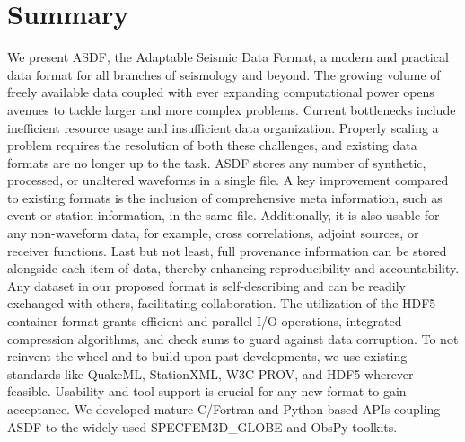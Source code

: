 \section{Summary}

We present ASDF, the Adaptable Seismic Data Format, a modern and practical data
format for all branches of seismology and beyond.
The growing volume of freely available data coupled with ever expanding
computational power opens avenues to tackle larger and more complex problems.
Current bottlenecks include inefficient resource usage and insufficient data
organization. Properly scaling a problem requires the resolution of both these
challenges, and existing data formats are no longer up to the task.
ASDF stores any number of synthetic, processed, or unaltered waveforms in a
single file. A key improvement compared to existing formats is the inclusion of
comprehensive meta information, such as event or station information, in the
same file.  Additionally, it is also usable for any non-waveform data, for
example, cross correlations, adjoint sources, or receiver functions. Last but
not least, full provenance information can be stored alongside each item of
data, thereby enhancing reproducibility and accountability. Any dataset in our
proposed format is self-describing and can be readily exchanged with others,
facilitating collaboration.
The utilization of the HDF5 container format grants efficient and parallel
I/O operations, integrated compression algorithms, and check sums to guard
against data corruption. To not reinvent the wheel and to build upon past
developments, we use existing standards like QuakeML, StationXML, W3C PROV, and
HDF5 wherever feasible.
Usability and tool support is crucial for any new format to gain acceptance. We
developed mature C/Fortran and Python based APIs coupling ASDF to the widely
used SPECFEM3D\_GLOBE and ObsPy toolkits.
